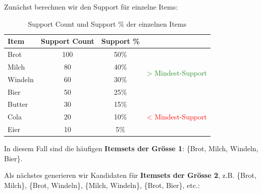 \begin{myexample}
\begin{table}[H]
        \caption{Beispielhafte Transaktionsdaten}
    \end{table}
    Zunächst berechnen wir den Support für einzelne Items:
    \begin{table}[H]
        \centering
        \begin{tabular}{l|c|c|l}
            \textbf{Item} & \textbf{Support Count} & \textbf{Support} \% &                                                             \\
            \midrule
            Brot          & 100                    & 50\%                & \multirow{4}{*}{\textcolor{ForestGreen}{> Mindest-Support}} \\
            Milch         & 80                     & 40\%                &                                                             \\
            Windeln       & 60                     & 30\%                &                                                             \\
            Bier          & 50                     & 25\%                &                                                             \\\midrule\midrule
            Butter        & 30                     & 15\%                & \multirow{4}{*}{\textcolor{red}{< Mindest-Support}}         \\
            Cola          & 20                     & 10\%                &                                                             \\
            Eier          & 10                     & 5\%                 &                                                             \\
        \end{tabular}
        \caption{Support Count und Support \% der einzelnen Items}
    \end{table}
    In diesem Fall sind die häufigen \textbf{Itemsets der Grösse 1}: \{Brot, Milch, Windeln, Bier\}.

    Als nächstes generieren wir Kandidaten für \textbf{Itemsets der Grösse 2}, z.B. \{Brot, Milch\}, \{Brot, Windeln\}, \{Milch, Windeln\}, \{Brot, Bier\}, etc.:


\end{myexample}
